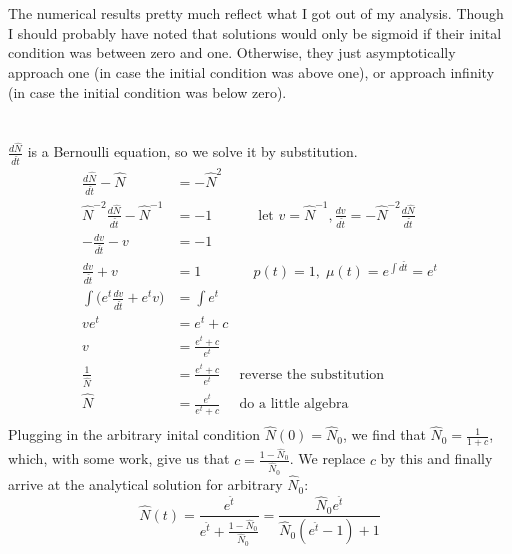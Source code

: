 \documentclass{article}
\begin{document}
\pagebreak

\section{}
The numerical results pretty much reflect what I got out of my analysis. Though I
should probably have noted that solutions would only be sigmoid if their inital
condition was between zero and one. Otherwise, they just asymptotically approach
one (in case the initial condition was above one), or approach infinity (in case
the initial condition was below zero).

\section{}
\(\frac{d\hat{N}}{d\hat{t}}\) is a Bernoulli equation, so we solve it by substitution.
\begin{align*}
    \frac{d\hat{N}}{d\hat{t}} - \hat{N} & = -\hat{N}^2 \\
    \hat{N}^{-2}\frac{d\hat{N}}{d\hat{t}} - \hat{N}^{-1} & = -1 & \quad \text{ let } v = \hat{N}^{-1}, \frac{dv}{d\hat{t}} = -\hat{N}^{-2}\frac{d\hat{N}}{d\hat{t}} \\
    -\frac{dv}{d\hat{t}} - v & = -1 \\
    \frac{dv}{d\hat{t}} + v & = 1 & \quad p(t) = 1, \; \mu(t) = e^{\int d\hat{t}} = e^{t} \\
    \int \lparen e^{t}\frac{dv}{d\hat{t}} + e^{t}v \rparen & = \int e^{t} \\
    ve^{t} & = e^{t} + c \\
    v & = \frac{e^{t} + c}{e^{t}} \\
    \frac{1}{\hat{N}} & = \frac{e^{t} + c}{e^{t}} & \text{reverse the substitution} \\
    \hat{N} & = \frac{e^t}{e^t + c} & \text{do a little algebra} \\
\end{align*}
Plugging in the arbitrary inital condition \(\hat{N}(0) = \hat{N}_0\), we find that
\(\hat{N}_0 = \frac{1}{1 + c}\), which, with some work, give us that
\(c = \frac{1 - \hat{N}_0}{\hat{N}_0}\). We replace \(c\) by this and finally arrive
at the analytical solution for arbitrary \(\hat{N}_0\):
\[ \hat{N}(t) = \frac{e^{\hat{t}}}{e^{\hat{t}} + \frac{1 - \hat{N}_0}{\hat{N}_0}}
              = \frac{\hat{N}_0e^{\hat{t}}}{\hat{N}_0(e^{\hat{t}} - 1) + 1} \]
\end{document}
